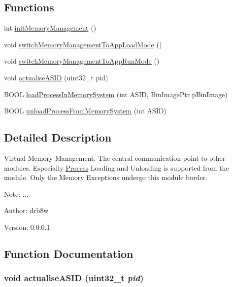 \subsection*{Functions}
\begin{CompactItemize}
\item 
int \hyperlink{group___v_m_m_g243fac608384b4b91246e465a206e72d}{initMemoryManagement} ()
\item 
void \hyperlink{group___v_m_m_g95c733b81f5f912811660319f6dede57}{switchMemoryManagementToAppLoadMode} ()
\item 
void \hyperlink{group___v_m_m_g5c5572a6e8f5df265dd936c6e3e9c062}{switchMemoryManagementToAppRunMode} ()
\item 
void \hyperlink{group___v_m_m_g818719d1d1577fd4cb90e1ef13994386}{actualiseASID} (uint32\_\-t pid)
\item 
BOOL \hyperlink{group___v_m_m_gfbd1dbe50bf30f665f1a4fc181655778}{loadProcessInMemorySystem} (int ASID, BinImagePtr pBinImage)
\item 
BOOL \hyperlink{group___v_m_m_g8769d0f39e7a7bab4a27e72db8b31ef3}{unloadProcessFromMemorySystem} (int ASID)
\end{CompactItemize}


\subsection{Detailed Description}
Virtual Memory Management. The central communication point to other modules. Especially \hyperlink{struct_process}{Process} Loading and Unloading is supported from the module. Only the Memory Exceptions undergo this module border. 

\begin{Desc}
\item[Note:]... \end{Desc}
\begin{Desc}
\item[Author:]drb8w \end{Desc}
\begin{Desc}
\item[Version:]0.0.0.1 \end{Desc}


\subsection{Function Documentation}
\hypertarget{group___v_m_m_g818719d1d1577fd4cb90e1ef13994386}{
\subsubsection[{actualiseASID}]{\setlength{\rightskip}{0pt plus 5cm}void actualiseASID (uint32\_\-t {\em pid})}}
\label{group___v_m_m_g818719d1d1577fd4cb90e1ef13994386}


